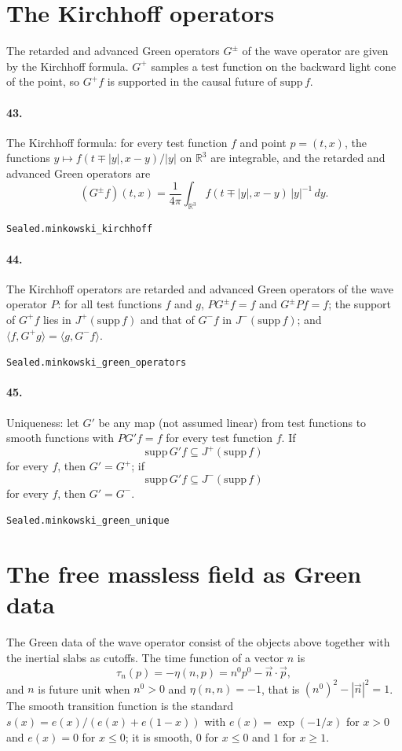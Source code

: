 \documentclass[11pt]{article}
\begin{document}
\section*{The Kirchhoff operators}
The retarded and advanced Green operators $G^\pm$ of the wave operator are given by the Kirchhoff formula. $G^+$ samples a test function on the backward light cone of the point, so $G^+ f$ is supported in the causal future of $\mathrm{supp}\, f$.

\paragraph{43.} The Kirchhoff formula: for every test function $f$ and point $p = (t, x)$, the functions $y \mapsto f(t \mp |y|, x - y)/|y|$ on $\mathbb R^3$ are integrable, and the retarded and advanced Green operators are \[(G^\pm f)(t, x) = \frac{1}{4\pi} \int_{\mathbb R^3} f(t \mp |y|, x - y)\, |y|^{-1}\, dy.\]\par{\footnotesize\texttt{Sealed.minkowski\_kirchhoff}}

\paragraph{44.} The Kirchhoff operators are retarded and advanced Green operators of the wave operator $P$: for all test functions $f$ and $g$, $P G^\pm f = f$ and $G^\pm P f = f$; the support of $G^+ f$ lies in $J^+(\mathrm{supp}\, f)$ and that of $G^- f$ in $J^-(\mathrm{supp}\, f)$; and $\langle f, G^+ g \rangle = \langle g, G^- f \rangle$.\par{\footnotesize\texttt{Sealed.minkowski\_green\_operators}}

\paragraph{45.} Uniqueness: let $G'$ be any map (not assumed linear) from test functions to smooth functions with $P G' f = f$ for every test function $f$. If \[\mathrm{supp}\, G' f \subseteq J^+(\mathrm{supp}\, f)\] for every $f$, then $G' = G^+$; if \[\mathrm{supp}\, G' f \subseteq J^-(\mathrm{supp}\, f)\] for every $f$, then $G' = G^-$.\par{\footnotesize\texttt{Sealed.minkowski\_green\_unique}}

\section*{The free massless field as Green data}
The Green data of the wave operator consist of the objects above together with the inertial slabs as cutoffs. The time function of a vector $n$ is \[\tau_n(p) = -\eta(n, p) = n^0 p^0 - \vec n \cdot \vec p,\] and $n$ is future unit when $n^0 > 0$ and $\eta(n, n) = -1$, that is $(n^0)^2 - |\vec n|^2 = 1$. The smooth transition function is the standard $s(x) = e(x)/(e(x) + e(1 - x))$ with $e(x) = \exp(-1/x)$ for $x > 0$ and $e(x) = 0$ for $x \le 0$; it is smooth, $0$ for $x \le 0$ and $1$ for $x \ge 1$.
\end{document}
